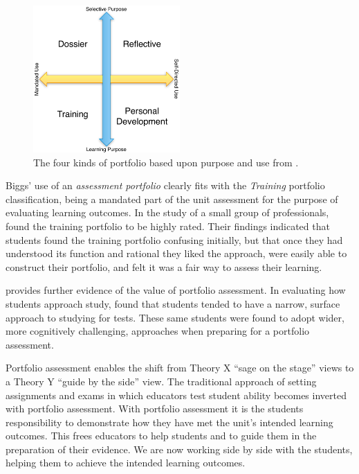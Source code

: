 \begin{figure}[htbp]
	\centering
	\includegraphics[width=0.50\textwidth]{PortfolioTypes}
	\caption{The four kinds of portfolio based upon purpose and use from \citet{Smith:2001}.}
	\label{fig:portfolio_types}
\end{figure}

Biggs' use of an \emph{assessment portfolio} clearly fits with the \emph{Training} portfolio classification, being a mandated part of the unit assessment for the purpose of evaluating learning outcomes. In the study of a small group of professionals, \citet{Smith:2001} found the training portfolio to be highly rated. Their findings indicated that students found the training portfolio confusing initially, but that once they had understood its function and rational they liked the approach, were easily able to construct their portfolio, and felt it was a fair way to assess their learning.

\citet{Tang:1999} provides further evidence of the value of portfolio assessment. In evaluating how students approach study, \citet{Tang:1999} found that students tended to have a narrow, surface approach to studying for tests. These same students were found to adopt wider, more cognitively challenging, approaches when preparing for a portfolio assessment. 

Portfolio assessment enables the shift from Theory X ``sage on the stage'' views to a Theory Y ``guide by the side'' view. The traditional approach of setting assignments and exams in which educators test student ability becomes inverted with portfolio assessment. With portfolio assessment it is the students responsibility to demonstrate how they have met the unit's intended learning outcomes. This frees educators to help students and to guide them in the preparation of their evidence. We are now working side by side with the students, helping them to achieve the intended learning outcomes.

